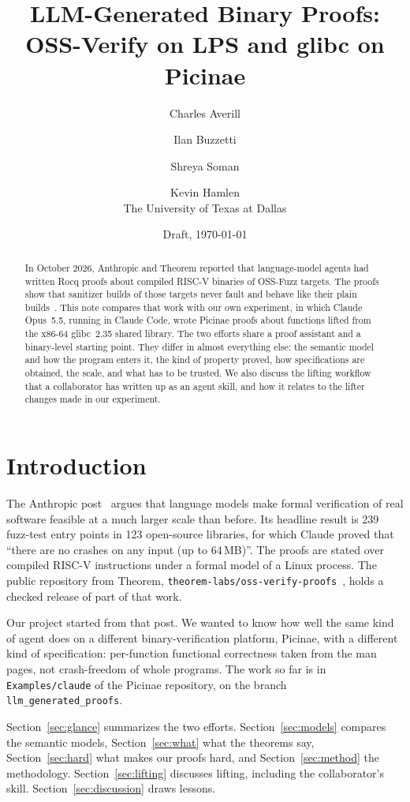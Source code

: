 \documentclass[11pt]{article}
\title{LLM-Generated Binary Proofs: \\
       OSS-Verify on LPS and glibc on Picinae}
\author{Charles Averill \and Ilan Buzzetti \and Shreya Soman \and Kevin Hamlen \\[1ex]
        The University of Texas at Dallas}
\date{Draft, \today}
\newcommand{\code}[1]{\texttt{#1}}
\begin{document}
\sloppy
\maketitle

\begin{abstract}
In October 2026, Anthropic and Theorem reported that language-model agents
had written Rocq proofs about compiled RISC-V binaries of OSS-Fuzz targets.
The proofs show that sanitizer builds of those targets never fault and behave
like their plain builds~\cite{anthropic-post,oss-verify}.  This note compares
that work with our own experiment, in which Claude Opus~5.5, running in
Claude Code, wrote Picinae proofs about functions lifted from the x86-64
glibc~2.35 shared library.  The two efforts share a proof assistant and a
binary-level starting point.  They differ in almost everything else: the
semantic model and how the program enters it, the kind of property proved,
how specifications are obtained, the scale, and what has to be trusted.  We
also discuss the lifting workflow that a collaborator has written up as an
agent skill, and how it relates to the lifter changes made in our
experiment.
\end{abstract}

\section{Introduction}

The Anthropic post~\cite{anthropic-post} argues that language models make
formal verification of real software feasible at a much larger scale than
before.  Its headline result is 239 fuzz-test entry points in 123 open-source
libraries, for which Claude proved that ``there are no crashes on any input
(up to 64\,MB)''.  The proofs are stated over compiled RISC-V instructions
under a formal model of a Linux process.  The public repository from Theorem,
\code{theorem-labs/oss-verify-proofs}~\cite{oss-verify}, holds a checked
release of part of that work.

Our project started from that post.  We wanted to know how well the same kind
of agent does on a different binary-verification platform, Picinae, with a
different kind of specification: per-function functional correctness taken
from the man pages, not crash-freedom of whole programs.  The work so far is
in \code{Examples/claude} of the Picinae repository, on the branch
\code{llm\_generated\_proofs}.

Section~\ref{sec:glance} summarizes the two efforts.
Section~\ref{sec:models} compares the semantic models,
Section~\ref{sec:what} what the theorems say,
Section~\ref{sec:hard} what makes our proofs hard, and
Section~\ref{sec:method} the methodology.
Section~\ref{sec:lifting} discusses lifting, including the collaborator's
skill.  Section~\ref{sec:discussion} draws lessons.
\end{document}
